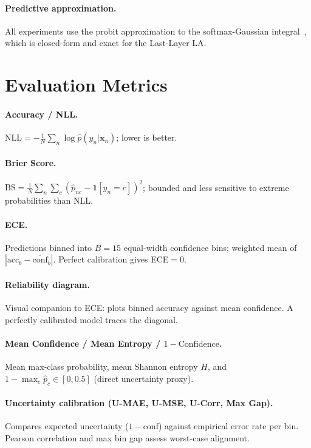 \documentclass[12pt,a4paper]{article}
\begin{document}
\paragraph{Predictive approximation.}
All experiments use the probit approximation to the softmax-Gaussian
integral~\citep{daxberger2021laplace}, which is closed-form and exact for
the Last-Layer LA.

\section{Evaluation Metrics}
\label{sec:metrics}

\paragraph{Accuracy / NLL.}
$\mathrm{NLL}=-\frac{1}{N}\sum_n\log\hat{p}(y_n|\bm{x}_n)$; lower is better.

\paragraph{Brier Score.}
$\mathrm{BS}=\frac{1}{N}\sum_n\sum_c(\hat{p}_{nc}-\mathbf{1}[y_n=c])^2$;
bounded and less sensitive to extreme probabilities than NLL.

\paragraph{ECE.}
Predictions binned into $B=15$ equal-width confidence bins; weighted mean
of $|\overline{\mathrm{acc}}_b-\overline{\mathrm{conf}}_b|$.
Perfect calibration gives ECE$=0$.

\paragraph{Reliability diagram.}
Visual companion to ECE: plots binned accuracy against mean confidence.
A perfectly calibrated model traces the diagonal.

\paragraph{Mean Confidence / Mean Entropy / $1-\text{Confidence}$.}
Mean max-class probability, mean Shannon entropy $H$, and
$1-\max_c\hat{p}_c\in[0,0.5]$ (direct uncertainty proxy).

\paragraph{Uncertainty calibration (U-MAE, U-MSE, U-Corr, Max Gap).}
Compares expected uncertainty ($1-\text{conf}$) against empirical error rate
per bin. Pearson correlation and max bin gap assess worst-case alignment.
\end{document}
